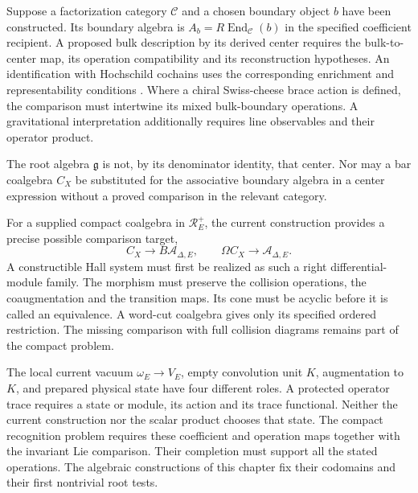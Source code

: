 \begin{remark}
\label{rem:bkm-target-not-bulk}
\label{rem:bkm-universal-holography-scope}
Suppose a factorization category $\mathcal C$ and a chosen boundary
object $b$ have been constructed. Its boundary algebra is
$A_b=R\operatorname{End}_{\mathcal C}(b)$ in the specified
coefficient recipient. A proposed bulk description by its derived
center requires the bulk-to-center map, its operation compatibility
and its reconstruction hypotheses. An identification with Hochschild
cochains uses the corresponding enrichment and representability
conditions \cite{ChiralBarCobarVolI,ChiralBarCobarVolII}.
Where a chiral Swiss-cheese brace action is defined, the comparison
must intertwine its mixed bulk-boundary operations. A gravitational
interpretation additionally requires line observables and their
operator product.

The root algebra $\mathfrak g$ is not, by its denominator identity,
that center. Nor may a bar coalgebra $C_X$ be substituted for the
associative boundary algebra in a center expression without a
proved comparison in the relevant category.

For a supplied compact coalgebra in $\mathcal R_E^+$, the current
construction provides a precise possible comparison target,
\[
 C_X\longrightarrow B\mathcal A_{\Delta,E},
 \qquad
 \Omega C_X\longrightarrow\mathcal A_{\Delta,E}.
\]
A constructible Hall system must first be realized as such a
right differential-module family. The morphism must preserve the
collision operations, the coaugmentation and the transition maps.
Its cone must be acyclic before it is called an equivalence.
A word-cut coalgebra gives only its specified ordered restriction.
The missing comparison with full collision diagrams remains part
of the compact problem.
\end{remark}

The local current vacuum $\omega_E\to V_E$, empty convolution
unit $K$, augmentation to $K$, and prepared physical state have
four different roles. A protected operator trace
requires a state or module, its action and its trace functional.
Neither the current construction nor the scalar product chooses
that state. The compact recognition problem requires these coefficient and
operation maps together with the invariant Lie comparison. Their
completion must support all the stated operations. The algebraic constructions of this chapter fix their
codomains and their first nontrivial root tests.
